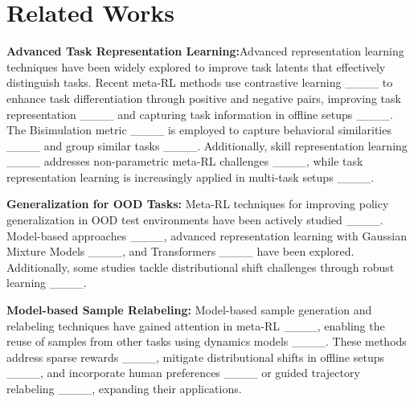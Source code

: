 \section{Related Works}
\label{sec:related_works}
\textbf{Advanced Task Representation Learning:}Advanced representation learning techniques have been widely explored to improve task latents that effectively distinguish tasks. Recent meta-RL methods use contrastive learning ____ to enhance task differentiation through positive and negative pairs, improving task representation ____ and capturing task information in offline setups ____. The Bisimulation metric ____ is employed to capture behavioral similarities ____ and group similar tasks ____. Additionally, skill representation learning ____ addresses non-parametric meta-RL challenges ____, while task representation learning is increasingly applied in multi-task setups ____.

\noindent \textbf{Generalization for OOD Tasks:} Meta-RL techniques for improving policy generalization in OOD test environments have been actively studied ____. Model-based approaches ____, advanced representation learning with Gaussian Mixture Models ____, and Transformers ____ have been explored. Additionally, some studies tackle distributional shift challenges through robust learning ____.


\noindent \textbf{Model-based Sample Relabeling:} Model-based sample generation and relabeling techniques have gained attention in meta-RL ____, enabling the reuse of samples from other tasks using dynamics models ____. These methods address sparse rewards ____, mitigate distributional shifts in offline setups ____, and incorporate human preferences ____ or guided trajectory relabeling ____, expanding their applications.